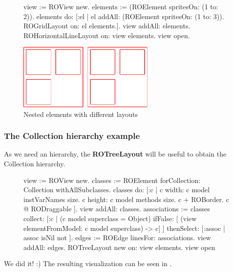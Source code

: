 \documentclass[a4paper,10pt,twoside]{book}
\begin{document}
\begin{figure}[H]
      \begin{minipage}[t]{0.61\textwidth}
      \vspace{0pt}
     \begin{code}{}
view := ROView new.
elements := (ROElement spritesOn: (1 to: 2)).
elements 
	do: [:el | el addAll: (ROElement spritesOn: (1 to: 3)). 
			   ROGridLayout on: el elements.].			   
view addAll: elements.
ROHorizontalLineLayout on: view elements.
view open.
  \end{code}
   \end{minipage}
   \hfill
   \begin{minipage}[t]{0.6\textwidth}
      \vspace{0pt} \raggedright
       \centering
		\includegraphics[width=0.6\textwidth]{nestedLayout}
   \end{minipage}
\label{fig:nestedLayout}
\caption{Nested elements with different layouts }
\end{figure} 

\subsubsection*{The Collection hierarchy example}
As we need an hierarchy, the \textbf{ROTreeLayout} will be useful to obtain the Collection hierarchy.
\begin{figure}[H]
\begin{code}{}
view := ROView new.
classes := ROElement forCollection: Collection withAllSubclasses.
classes do: [:c | 
	c width: c model instVarNames size.
	c height: c model methods size.
	c + ROBorder. 
	c @ RODraggable ].
view addAll: classes.
associations := classes collect: [:c | 
	(c model superclass = Object)
		ifFalse: [ (view elementFromModel: c model superclass) -> c]
	 ] thenSelect: [:assoc | assoc isNil not ].
edges := ROEdge linesFor: associations.
view addAll: edges.
ROTreeLayout new on: view elements.
view open
\end{code}
\end{figure}

We did it! :)  The resulting visualization can be seen in .
\end{document}
